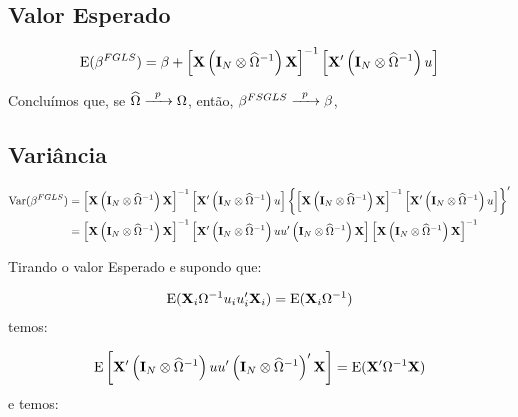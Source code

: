 \documentclass[11pt, oneside, a4paper, article]{article}
\numberwithin{equation}{section}
\begin{document}
\begin{description}
\subsection{Valor Esperado}

\vspace{-1 em}
\begin{align*}
\text{E}(\beta^{FGLS})
= 
\beta +
\left[ \mathbf{X} \left( \mathbf{I}_{N} \otimes \widehat{\Omega}^{-1} \right) \mathbf{X} \right]^{-1}
\left[ \mathbf{X}' \left( \mathbf{I}_{N} \otimes \widehat{\Omega}^{-1} \right) u \right]
\end{align*}

Concluímos que, se 
$\widehat{\Omega} \xrightarrow{\enskip p \enskip} \Omega$,
então,
$\beta^{FSGLS} \xrightarrow{\enskip p \enskip} \beta$,

\subsection{Variância}

\vspace{-1 em}
\begin{align*}
\text{Var}(\beta^{FGLS})
&= 
\left[ \mathbf{X} \left( \mathbf{I}_{N} \otimes \widehat{\Omega}^{-1} \right) \mathbf{X} \right]^{-1}
\left[ \mathbf{X}' \left( \mathbf{I}_{N} \otimes \widehat{\Omega}^{-1} \right) u \right]
\left\{ 
\left[ \mathbf{X} \left( \mathbf{I}_{N} \otimes \widehat{\Omega}^{-1} \right) \mathbf{X} \right]^{-1}
\left[ \mathbf{X}' \left( \mathbf{I}_{N} \otimes \widehat{\Omega}^{-1} \right) u \right]
\right\}^{\prime}
\\
&=
\left[ \mathbf{X} \left( \mathbf{I}_{N} \otimes \widehat{\Omega}^{-1} \right) \mathbf{X} \right]^{-1}
\left[
\mathbf{X}' \left( \mathbf{I}_{N} \otimes \widehat{\Omega}^{-1} \right) 
u u'
\left( \mathbf{I}_{N} \otimes \widehat{\Omega}^{-1} \right) \mathbf{X}
\right]
\left[ \mathbf{X} \left( \mathbf{I}_{N} \otimes \widehat{\Omega}^{-1} \right) \mathbf{X} \right]^{-1}
\end{align*}

Tirando o valor Esperado e supondo que:

\vspace{-1.5 em}
\begin{align*}
\text{E}(\mathbf{X}_{i} \Omega^{-1} u_{i} u_{i}' \mathbf{X}_{i}) = \text{E}(\mathbf{X}_{i} \Omega^{-1})
\end{align*}
temos:

\vspace{-1.5 em}
\begin{align*}
\text{E}\left[ \mathbf{X}' \left( \mathbf{I}_{N} \otimes \widehat{\Omega}^{-1} \right)
	u u'
\left( \mathbf{I}_{N} \otimes \widehat{\Omega}^{-1} \right)' \mathbf{X} \right]
=
\text{E}(\mathbf{X}' \Omega^{-1} \mathbf{X})
\end{align*}
e temos:


\end{description}
\end{document}
